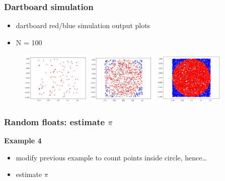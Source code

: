 \documentclass[english,14pt]{beamer}
\begin{document}
\begin{frame}[fragile]

\frametitle{Dartboard simulation}

\begin{itemize}
	\item dartboard red/blue simulation output plots
	\item N = 100
\end{itemize}

\begin{figure}[ht]
	\centering
	\includegraphics[width=0.3\textwidth]{figures/dartboard100}%
	\includegraphics[width=0.3\textwidth]{figures/dartboard1000}%
	\includegraphics[width=0.3\textwidth]{figures/dartboard10000}
\end{figure}

\end{frame}


\begin{frame}[fragile]

\frametitle{Random floats: estimate $\pi$}

\textbf{Example 4}\\
\vspace*{5mm}
\begin{itemize}
	\item modify previous example to count points inside circle, hence\ldots
	\item estimate $\pi$
\end{itemize}

\end{frame}
\end{document}
